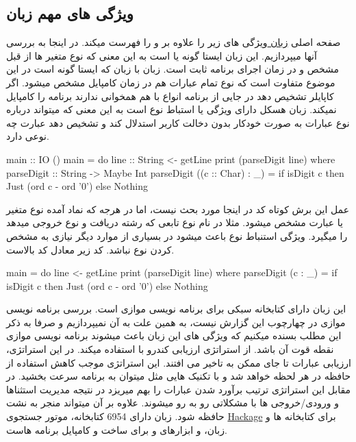 \subsection{
ویژگی های مهم زبان
}
صفحه اصلی 
\href{https://haskell.org/}{
زبان
}
ویژگی های زیر را علاوه بر 
و 
را فهرست میکند. در اینجا به بررسی آنها میپردازیم. 
\newline
این زبان ایستا گونه یا 
است به این معنی که نوع متغیر ها از قبل مشخص و در زمان اجرای برنامه ثابت است. زبان 
با زبان 
که ایستا گونه است در این موضوع متفاوت است که نوع تمام عبارات هم در زمان کامپایل مشخص میشود. اگر کاپایلر تشخیص دهد در جایی از برنامه انواع با هم همخوانی ندارند برنامه را کامپایل نمیکند. 
زبان هسکل دارای ویژگی 
یا استباط نوع است به این معنی که میتواند درباره نوع عبارات به صورت خودکار بدون دخالت کاربر استدلال کند و تشخیص دهد عبارت چه نوعی دارد.
\begin{latin}
\begin{ghcode}
main :: IO ()
main = do line :: String <- getLine
          print (parseDigit line)
  where parseDigit :: String -> Maybe Int
        parseDigit ((c :: Char) : _) =
          if isDigit c
             then Just (ord c - ord '0')
             else Nothing
\end{ghcode}
\end{latin}
عمل این برش کوتاه کد در اینجا مورد بحث نیست، اما در هرجه که نماد
\hs{::}
 آمده نوع متغیر یا عبارت مشخص میشود. مثلا در
نام 
نوع تابعی که رشته دریافت و نوع 
خروجی میدهد را میگیرد. ویژگی استنباط نوع باعث میشود در بسیاری از موارد دیگر نیازی به مشخص کردن نوع نباشد. کد زیر معادل کد بالاست. 
\begin{latin}
\begin{ghcode}
main = do line <- getLine
          print (parseDigit line)
  where parseDigit (c : _) =
          if isDigit c
             then Just (ord c - ord '0')
             else Nothing
\end{ghcode}
\end{latin}
\newline
این زبان دارای کتابخانه سبکی برای برنامه نویسی موازی است. بررسی برنامه نویسی موازی در چهارچوب این گزارش نیست، به همین علت به آن نمیپردازیم و صرفا به ذکر این مطلب بسنده میکنیم که ویژگی های این زبان باعث میشوند برنامه نویسی موازی نقطه قوت آن باشد.
\newline
{}
از استراتژی ارزیابی کندرو با 
استفاده میکند. در این استراتژی، ارزیابی عبارات تا جای ممکن به تاخیر می افتند. این استراتژی موجب کاهش استفاده از حافظه در هر لحظه خواهد شد و با تکنیک هایی مثل 
میتوان به برنامه سرعت بخشید. در مقابل این استراتژی ترتیب برآورد شدن عبارات را بهم میریزد در نتیجه مدیریت استثناها و ورودی/خروجی ها با مشکلاتی رو به رو میشوند. علاوه بر آن میتواند منجر به نشت حافظه شود.
\newline
زبان 
دارای 6954 کتابخانه، موتور جستجوی
\href{https://hackage.haskell.org/}{Hackage}
 برای کتابخانه ها و زبان، و ابزارهای 
و 
برای ساخت و کامپایل برنامه هاست.